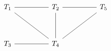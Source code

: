 \[\begin{tikzcd}
	{T_1} && {T_2} && {T_5} \\
	\\
	{T_3} && {T_4}
	\arrow[no head, from=3-3, to=1-1]
	\arrow[no head, from=3-3, to=1-3]
	\arrow[no head, from=3-3, to=1-5]
	\arrow[no head, from=3-1, to=3-3]
	\arrow[no head, from=1-1, to=1-3]
	\arrow[no head, from=1-3, to=1-5]
\end{tikzcd}\]